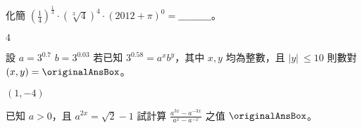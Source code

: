 \begin{QUESTIONS}
\begin{QUESTION}
\begin{QANS}
    \end{QANS}
    \begin{QSOL}
    \end{QSOL}
    \begin{QEMPTYSPACE}
    \end{QEMPTYSPACE}
\end{QUESTION}
\begin{QUESTION}
    \begin{QBODY}
        化簡 ${{\left( \frac{1}{4} \right)}^{\frac{1}{3}}}\cdot {{\left( \sqrt[3]{4} \right)}^{4}}\cdot {{\left( 2012+\pi  \right)}^{0}}=\_\_\_\_\_\_\_\_\_\_$。
    \end{QBODY}
    \begin{QFROMS}
    \end{QFROMS}
    \begin{QTAGS} \end{QTAGS}
    \begin{QANS}
        $4$
    \end{QANS}
    \begin{QSOL}
    \end{QSOL}
    \begin{QEMPTYSPACE}
    \end{QEMPTYSPACE}
\end{QUESTION}
\begin{QUESTION}
    \begin{QBODY}
        設 $a={{3}^{0.7}}$ $b={{3}^{0.03}}$ 若已知 ${{3}^{0.58}}={{a}^{x}}{{b}^{y}}$，其中 $x,y$ 均為整數，且 $|y|\ \le 10$ 
        則數對 $\left( x,y \right)= \originalAnsBox $。
    \end{QBODY}
    \begin{QFROMS}
    \end{QFROMS}
    \begin{QTAGS} \end{QTAGS}
    \begin{QANS}
        $\left( 1,-4 \right)$
    \end{QANS}
    \begin{QSOL}
    \end{QSOL}
    \begin{QEMPTYSPACE}
    \end{QEMPTYSPACE}
\end{QUESTION}
\begin{QUESTION}
    \begin{QBODY}
        已知 $a>0$，且 ${{a}^{2x}}=\sqrt{2}-1$ 試計算 $\frac{{{a}^{3x}}-{{a}^{-3x}}}{{{a}^{x}}-{{a}^{-x}}}$ 之值 $\originalAnsBox$。

\end{QBODY}
\end{QUESTION}
\end{QUESTIONS}
